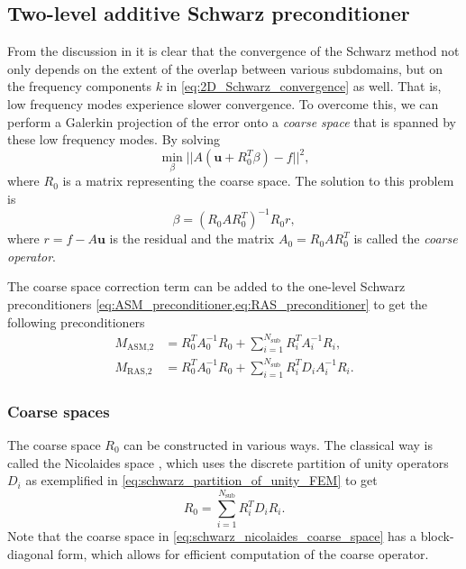 \subsection{Two-level additive Schwarz preconditioner}\label{sec:schwarz_coarse_space}
From the discussion in  it is clear that the convergence of the Schwarz method not only depends on the extent of the overlap between various subdomains, but on the frequency components $k$ in \cref{eq:2D_Schwarz_convergence} as well. That is, low frequency modes experience slower convergence. To overcome this, we can perform a Galerkin projection of the error onto a \textit{coarse space} that is spanned by these low frequency modes. By solving
\[
  \min_{\beta} ||A(\mathbf{u} + R_0^T\beta) - f||^2,
\]
where $R_0$ is a matrix representing the coarse space. The solution to this problem is
\[
  \beta = (R_0 A R_0^T)^{-1} R_0 r,
\]
where $r = f - A \mathbf{u}$ is the residual and the matrix $A_0 = R_0 A R_0^T$ is called the \textit{coarse operator}.

The coarse space correction term can be added to the one-level Schwarz preconditioners \cref{eq:ASM_preconditioner,eq:RAS_preconditioner} to get the following preconditioners
\begin{subequations}
  \begin{align}
    M_{\text{ASM,2}} & = R_0^T A_0^{-1} R_0 + \sum_{i=1}^{N_{\text{sub}}} R_i^T A_i^{-1} R_i , \label{eq:ASM_preconditioner_coarse}    \\
    M_{\text{RAS,2}} & = R_0^T A_0^{-1} R_0 + \sum_{i=1}^{N_{\text{sub}}} R_i^T D_i A_i^{-1} R_i \label{eq:RAS_preconditioner_coarse}.
  \end{align}
\end{subequations}

\subsubsection{Coarse spaces}
The coarse space $R_0$ can be constructed in various ways. The classical way is called the Nicolaides space \cite[Section 4.2]{schwarz_methods_Dolean_2015}, which uses the discrete partition of unity operators $D_i$ as exemplified in \cref{eq:schwarz_partition_of_unity_FEM} to get
\begin{equation}
  R_0 = \sum_{i=1}^{N_{\text{sub}}} R_i^T D_i R_i.
  \label{eq:schwarz_nicolaides_coarse_space}
\end{equation}
Note that the coarse space in \cref{eq:schwarz_nicolaides_coarse_space} has a block-diagonal form, which allows for efficient computation of the coarse operator.

